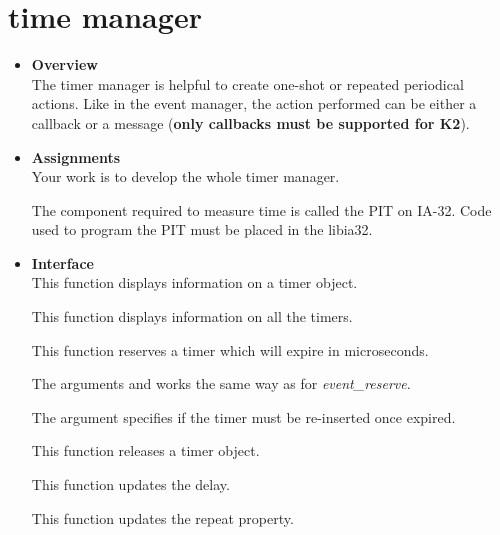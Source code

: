 \section{\textbf{time} manager}
\begin{itemize}
  \item {\bf Overview}\\

    The timer manager is helpful to create one-shot or repeated
    periodical actions. Like in the event manager, the action
    performed can be either a callback or a message (\textbf{only
    callbacks must be supported for K2}).

  \item {\bf Assignments}\\

    Your work is to develop the whole timer manager.

    The component required to measure time is called the PIT on
    IA-32. Code used to program the PIT must be placed in the libia32.

  \item {\bf Interface}\\
	 {
	   This function displays information on a timer object.
	 }

	 {
	   This function displays information on all the timers.
	 }

	 {
	   This function reserves a timer which will expire in
	    microseconds.

	   The arguments  and  works
	   the same way as for \emph{event\_reserve}.

	   The  argument specifies if the timer
	   must be re-inserted once expired.
	 }

	 {
	   This function releases a timer object.
	 }

	 {
	   This function updates the delay.
	 }

	 {
	   This function updates the repeat property.
	 }


\end{itemize}
